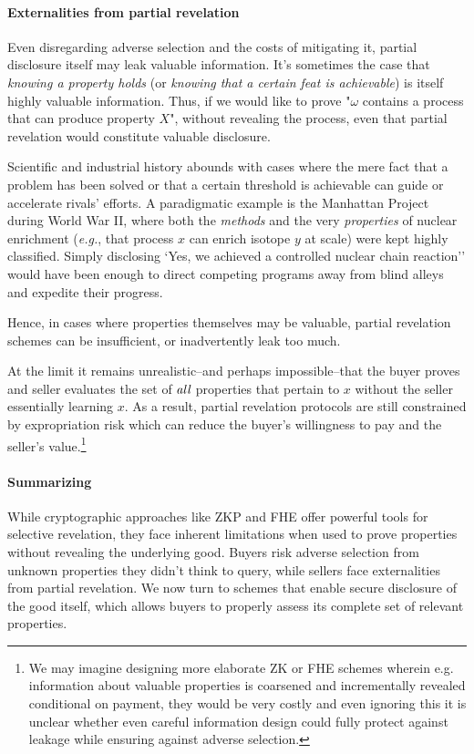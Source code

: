 \documentclass{article}
\begin{document}
\paragraph{Externalities from partial revelation} Even disregarding adverse selection and the costs of mitigating it, partial disclosure itself may leak valuable information. It's sometimes the case that \emph{knowing a property holds} (or \emph{knowing that a certain feat is achievable}) is itself highly valuable information. Thus, if we would like to prove "$\omega$ contains a process that can produce property $X$", without revealing the process, even that partial revelation would constitute valuable disclosure.

Scientific and industrial history abounds with cases where the mere fact that a problem has been solved 
or that a certain threshold is achievable can guide or accelerate rivals' efforts. 
A paradigmatic example is the Manhattan Project during World War II, 
where both the \emph{methods} and the very \emph{properties} of nuclear enrichment 
(\textit{e.g.}, that process $x$ can enrich isotope $y$ at scale) were kept highly classified. 
Simply disclosing `Yes, we achieved a controlled nuclear chain reaction'' 
would have been enough to direct competing programs away from blind alleys and expedite their progress.

Hence, in cases where properties themselves may be valuable, partial revelation schemes can be insufficient, or inadvertently leak too much.

At the limit it remains unrealistic--and perhaps impossible--that the buyer proves and seller evaluates the set of $\emph{all}$ properties that pertain to $x$ without the seller essentially learning $x$. As a result, partial revelation protocols are still constrained by expropriation risk which can reduce the buyer’s willingness to pay and the seller's value.\footnote{We may imagine designing more elaborate ZK or FHE schemes wherein e.g. information about valuable properties is coarsened and incrementally revealed conditional on payment, they would be very costly and even ignoring this it is unclear whether even careful information design could fully protect against leakage while ensuring against adverse selection.}

\paragraph{Summarizing} While cryptographic approaches like ZKP and FHE offer powerful tools for selective revelation, they face inherent limitations when used to prove properties without revealing the underlying good. Buyers risk adverse selection from unknown properties they didn't think to query, while sellers face externalities from partial revelation. We now turn to schemes that enable secure disclosure of the good itself, which allows buyers to properly assess its complete set of relevant properties.
\end{document}
